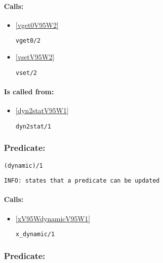 \paragraph{Calls:} 
\begin{itemize}
\item \ref{vget0V95W2} 
\begin{verbatim}
vget0/2
\end{verbatim}

\item \ref{vsetV95W2} 
\begin{verbatim}
vset/2
\end{verbatim}

\end{itemize}
\paragraph{Is called from:} 
\begin{itemize}
\item \ref{dyn2statV95W1} 
\begin{verbatim}
dyn2stat/1
\end{verbatim}

\end{itemize}

\subsubsection{Predicate:} \label{dynamicV95W1}

\begin{verbatim}
(dynamic)/1
\end{verbatim}

{\small \begin{verbatim}
INFO: states that a predicate can be updated

\end{verbatim}}
\paragraph{Calls:} 
\begin{itemize}
\item \ref{xV95WdynamicV95W1} 
\begin{verbatim}
x_dynamic/1
\end{verbatim}

\end{itemize}

\subsubsection{Predicate:} \label{dynbbgcV95W0}

